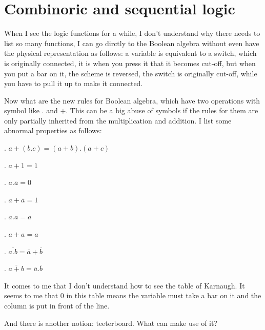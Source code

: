 \section{Combinoric and sequential logic}
When I see the logic functions for a while, I don't understand why there needs to list so many functions, I can go dirctly to the Boolean algebra without even have the physical representation as follows: a variable is equivalent to a switch, which is originally connected, it is when you press it that it becomes cut-off, but when you put a bar on it, the scheme is reversed, the switch is originally cut-off, while you have to pull it up to make it connected.

Now what are the new rules for Boolean algebra, which have two operations with symbol like $.$ and $+$. This can be a big abuse of symbols if the rules for them are only partially inherited from the multiplication and addition. I list some abnormal properties as follows:

. $a+(b.c)=(a+b).(a+c)$

. $a+1=1$

. $a.\overline{a}=0$

. $a+\overline{a}=1$

. $a.a=a$

. $a+a=a$

. $\overline{a.b}=\overline{a}+\overline{b}$

. $\overline{a+b}=\overline{a}.\overline{b}$

It comes to me that I don't understand how to see the table of Karnaugh. It seems to me that 0 in this table means the variable must take a bar on it and the column is put in front of the line.

And there is another notion: teeterboard. What can make use of it?